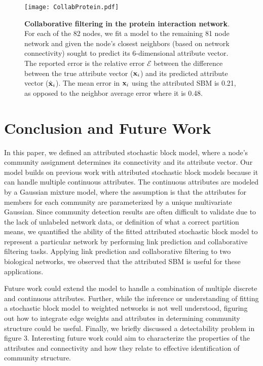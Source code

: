 \begin{figure}[h!]
\begin{center}
\texttt{[image: CollabProtein.pdf]}
\caption{{\bf Collaborative filtering in the protein interaction network}. For each of the 82 nodes, we fit a model to the remaining 81 node network and given the node's closest  neighbors (based on network connectivity) sought to predict its 6-dimensional attribute vector. The reported error is the relative error $\mathcal{E}$ between the difference between the true attribute vector (${\bf x}_{i}$) and its predicted attribute vector (${\hat{\bf x}}_{i}$). The mean error in ${\bf x}_{i}$ using the attributed SBM is 0.21, as opposed to the neighbor average error where it is 0.48. }
\label{collabprotein}
\end{center}
\end{figure}

\section{Conclusion and Future Work}
In this paper, we defined an attributed stochastic block model, where a node's community assignment determines its connectivity and its attribute vector. Our model builds on previous work with attributed stochastic block models because it can handle multiple continuous attributes. The continuous attributes are modeled by a Gaussian mixture model, where the assumption is that the attributes for members for each community are parameterized by a unique multivariate Gaussian. Since community detection results are often difficult to validate due to the lack of unlabeled network data, or definition of what a correct partition means, we quantified the ability of the fitted attributed stochastic block model to represent a particular network by performing link prediction and collaborative filtering tasks. Applying link prediction and collaborative filtering to two biological networks, we observed that the attributed SBM is useful for these applications.

Future work could extend the model to handle a combination of multiple discrete and continuous attributes. Further, while the inference or understanding of fitting a stochastic block model to weighted networks is not well understood, figuring out how to integrate edge weights and attributes in determining community structure could be useful. Finally, we briefly discussed a detectability problem in figure 3. Interesting future work could aim to characterize the properties of the attributes and connectivity and how they relate to effective identification of community structure.

